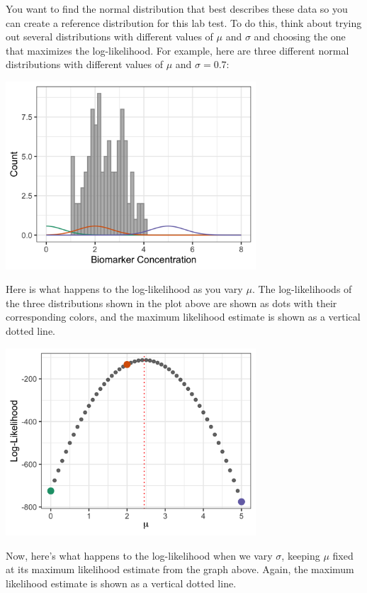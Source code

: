 You want to find the normal distribution that best describes these data so you can create a reference distribution for this lab test. To do this, think about trying out several distributions with different values of $\mu$ and $\sigma$ and choosing the one that maximizes the log-likelihood. For example, here are three different normal distributions with different values of $\mu$ and $\sigma=0.7$: 
\begin{center}
\includegraphics[width=0.7\textwidth]{img/normal-likelihood-example-data-normal.png}
\end{center}
Here is what happens to the log-likelihood as you vary $\mu$. The log-likelihoods of the three distributions shown in the plot above are shown as dots with their corresponding colors, and the maximum likelihood estimate is shown as a vertical dotted line.
\begin{center}
\includegraphics[width=0.7\textwidth]{img/normal-likelihood-example-vary-mu.png}
\end{center}
Now, here's what happens to the log-likelihood when we vary $\sigma$, keeping $\mu$ fixed at its maximum likelihood estimate from the graph above. Again, the maximum likelihood estimate is shown as a vertical dotted line. 
